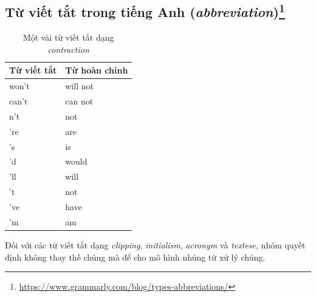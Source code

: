 \subsection*{Từ viết tắt trong tiếng Anh (\textit{abbreviation})\footnote{\url{https://www.grammarly.com/blog/types-abbreviations/}}}
\begin{table}[htb]
    \centering
    \caption{Một vài từ viết tắt dạng \textit{contraction}}
    \label{table:english-contractions}
    \begin{tabular}{ll}
        \toprule
        \textbf{Từ viết tắt} & \textbf{Từ hoàn chỉnh} \\\midrule
        won't                & will not               \\
        can't                & can not                \\
        n't                  & not                    \\
        're                  & are                    \\
        's                   & is                     \\
        'd                   & would                  \\
        'll                  & will                   \\
        't                   & not                    \\
        've                  & have                   \\
        'm                   & am                     \\
        \bottomrule
    \end{tabular}
\end{table}
Đối với các từ viết tắt dạng \textit{clipping}, \textit{initialism}, \textit{acronym} và \textit{textese}, nhóm quyết định không thay thế chúng mà để cho mô hình nhúng từ xử lý chúng.
